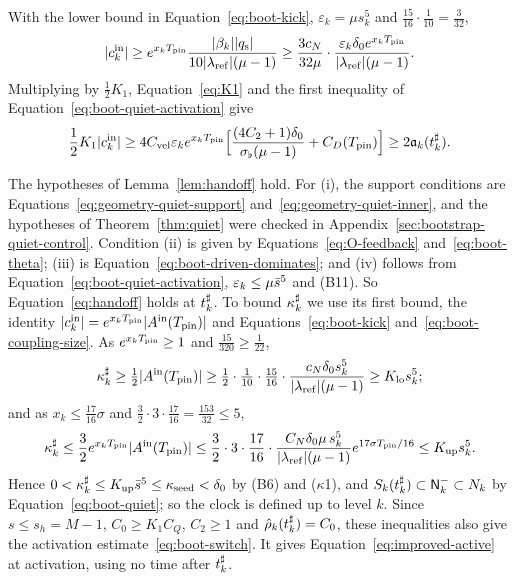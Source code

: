 With the lower bound in Equation~\eqref{eq:boot-kick}, $\varepsilon_k=\mu s_k^5$
and $\frac{15}{16}\cdot\frac1{10}=\frac3{32}$,
\begin{equation}
\label{eq:boot-driven-lower}
|c^{\mathrm{in}}_k|\ge e^{x_kT_{\mathrm{pin}}}\frac{|\beta_k||q_{\mathrm{s}}|}{10|\lambda_{\mathrm{ref}}|(\mu-1)}\ge\frac{3c_N}{32\mu}\cdot\frac{\varepsilon_k\delta_0e^{x_kT_{\mathrm{pin}}}}{|\lambda_{\mathrm{ref}}|(\mu-1)}.
\end{equation}
Multiplying by $\frac12K_1$, Equation~\eqref{eq:K1} and the first inequality of
Equation~\eqref{eq:boot-quiet-activation} give
\begin{equation}
\label{eq:boot-driven-dominates}
\frac12K_1|c^{\mathrm{in}}_k|\ge4C_{\mathrm{vel}} \varepsilon_ke^{x_kT_{\mathrm{pin}}}\Big[\frac{(4C_2+1)\delta_0}{\sigma_\flat(\mu-1)}+C_D(T_{\mathrm{pin}})\Big]\ge2\mathfrak{a}_k(t^\sharp_k).
\end{equation}

The hypotheses of Lemma~\ref{lem:handoff} hold. For (i), the support
conditions are Equations~\eqref{eq:geometry-quiet-support} and~\eqref{eq:geometry-quiet-inner},
and the hypotheses of Theorem~\ref{thm:quiet} were checked in
Appendix~\ref{sec:bootstrap-quiet-control}. Condition (ii) is given by
Equations~\eqref{eq:O-feedback} and~\eqref{eq:boot-theta}; (iii) is
Equation~\eqref{eq:boot-driven-dominates}; and (iv) follows from
Equation~\eqref{eq:boot-quiet-activation}, $\varepsilon_k\le\mu\bar s^5$ and (B11). So Equation~\eqref{eq:handoff} holds at $t^\sharp_k$. To bound $\kappa^\sharp_k$
we use its first bound, the identity
$|c^{\mathrm{in}}_k|=e^{x_kT_{\mathrm{pin}}}|A^{\mathrm{in}}(T_{\mathrm{pin}})|$ and
Equations~\eqref{eq:boot-kick} and~\eqref{eq:boot-coupling-size}. As $e^{x_kT_{\mathrm{pin}}}\ge1$ and $\frac{15}{320}\ge\frac1{22}$,
\begin{equation}
\label{eq:boot-amplitude-lower}
\kappa^\sharp_k\ge\tfrac12|A^{\mathrm{in}}(T_{\mathrm{pin}})|\ge\tfrac12\cdot\tfrac1{10}\cdot\tfrac{15}{16}\cdot\frac{c_N\delta_0s_k^5}{|\lambda_{\mathrm{ref}}|(\mu-1)}\ge K_{\mathrm{lo}} s_k^5;
\end{equation}
and as $x_k\le\frac{17}{16}\sigma$ and
$\frac32\cdot3\cdot\frac{17}{16}=\frac{153}{32}\le5$,
\begin{equation}
\label{eq:boot-amplitude-upper}
\kappa^\sharp_k\le\frac32e^{x_kT_{\mathrm{pin}}}|A^{\mathrm{in}}(T_{\mathrm{pin}})|\le\frac32\cdot3\cdot\frac{17}{16}\cdot\frac{C_N\delta_0\mu\,s_k^5}{|\lambda_{\mathrm{ref}}|(\mu-1)}e^{17\sigma T_{\mathrm{pin}}/16}\le K_{\mathrm{up}} s_k^5.
\end{equation}
Hence
$0<\kappa^\sharp_k\le K_{\mathrm{up}}\bar s^5\le\kappa_{\mathrm{seed}}<\delta_0$ by (B6) and ($\kappa$1), and
$S_k(t^\sharp_k)\subset\mathsf{N}^{-}_k\subset N_k$ by Equation~\eqref{eq:boot-quiet}; so the
clock is defined up to level $k$. Since $s\le s_h=M-1$, $C_0\ge K_1C_Q$,
$C_2\ge1$ and $\hat\rho_k(t^\sharp_k)=C_0$, these inequalities also give the
activation estimate~\eqref{eq:boot-switch}.
It gives Equation~\eqref{eq:improved-active} at activation, using no time
after $t^\sharp_k$.

